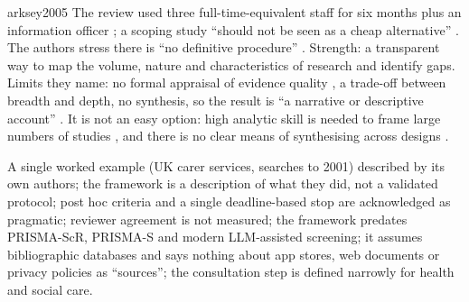 \begin{papercard}{arksey2005}
 The review used three full-time-equivalent staff for six months plus an information officer ; a scoping study ``should not be seen as a cheap alternative'' . The authors stress there is ``no definitive procedure'' . Strength: a transparent way to map the volume, nature and characteristics of research and identify gaps. Limits they name: no formal appraisal of evidence quality , a trade-off between breadth and depth, no synthesis, so the result is ``a narrative or descriptive account'' . It is not an easy option: high analytic skill is needed to frame large numbers of studies , and there is no clear means of synthesising across designs .

 A single worked example (UK carer services, searches to 2001) described by its own authors; the framework is a description of what they did, not a validated protocol; post hoc criteria and a single deadline-based stop are acknowledged as pragmatic; reviewer agreement is not measured; the framework predates PRISMA-ScR, PRISMA-S and modern LLM-assisted screening; it assumes bibliographic databases and says nothing about app stores, web documents or privacy policies as ``sources''; the consultation step is defined narrowly for health and social care.


\end{papercard}
